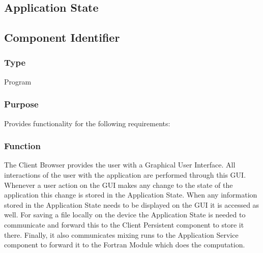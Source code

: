 
\subsection{Application State}
\label{subsec:appstate}

\subsection*{Component Identifier}
\RTMCAS{}

\subsubsection*{Type}
Program

\subsubsection*{Purpose}
Provides functionality for the following requirements:

\noindent {}

\subsubsection*{Function}
The Client Browser provides the user with a Graphical User Interface. All interactions of the user with the application are performed through this GUI. Whenever a user action on the GUI makes any change to the state of the application this change is stored in the Application State. When any information stored in the Application State needs to be displayed on the GUI it is accessed as well. For saving a file locally on the device the Application State is needed to communicate and forward this to the Client Persistent component to store it there. Finally, it also communicates mixing runs to the Application Service component to forward it to the Fortran Module which does the computation.


